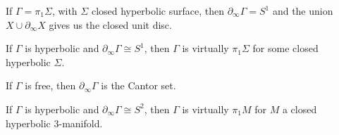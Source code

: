 \documentclass[a4paper]{article}
\begin{document}
\begin{eg}
  If $\Gamma = \pi_1 \Sigma$, with $\Sigma$ closed  hyperbolic surface, then $\partial_\infty \Gamma = S^1$ and the union $X \cup \partial_\infty X$ gives us the closed unit disc.
\end{eg}

\begin{thm}
  If $\Gamma$ is hyperbolic and $\partial_\infty \Gamma \cong S^1$, then $\Gamma$ is virtually $\pi_1 \Sigma$ for some closed hyperbolic $\Sigma$.
\end{thm}

\begin{eg}
  If $\Gamma$ is free, then $\partial_\infty \Gamma$ is the Cantor set.
\end{eg}

\begin{conjecture}[Cannon]
  If $\Gamma$ is hyperbolic and $\partial_\infty \Gamma \cong S^2$, then $\Gamma$ is virtually $\pi_1 M$ for $M$ a closed hyperbolic $3$-manifold.
\end{conjecture}

\printindex
\end{document}
